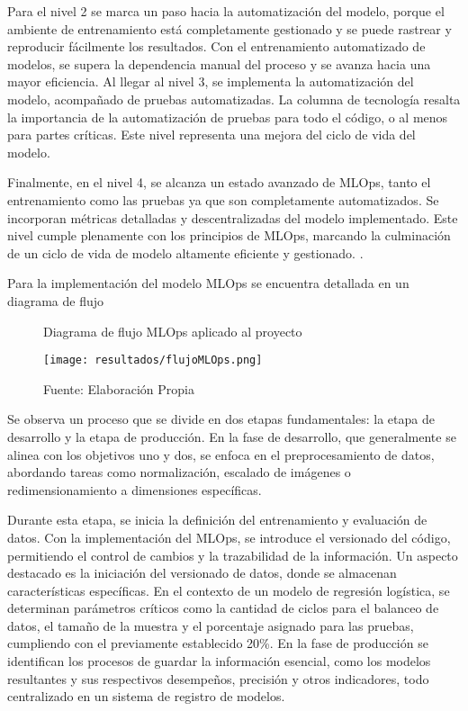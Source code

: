 Para el nivel 2 se marca un paso hacia la automatización del modelo, porque el ambiente de entrenamiento está completamente gestionado y se puede rastrear y reproducir fácilmente los resultados. Con el entrenamiento automatizado de modelos, se supera la dependencia manual del proceso y se avanza hacia una mayor eficiencia. Al llegar al nivel 3, se implementa la automatización del modelo, acompañado de pruebas automatizadas. La columna de tecnología resalta la importancia de la automatización de pruebas para todo el código, o al menos para partes críticas. Este nivel representa una mejora del ciclo de vida del modelo. \newline

Finalmente, en el nivel 4, se alcanza un estado avanzado de MLOps, tanto el entrenamiento como las pruebas ya que son completamente automatizados. Se incorporan métricas detalladas y descentralizadas del modelo implementado. Este nivel cumple plenamente con los principios de MLOps, marcando la culminación de un ciclo de vida de modelo altamente eficiente y gestionado. \citep{rivero2022, visengeriyeva2020}.

Para la implementación del modelo MLOps se encuentra detallada en un diagrama de flujo

\newpage

\begin{figure}[h]
\centering
\caption{Diagrama de flujo MLOps aplicado al proyecto}
\texttt{[image: resultados/flujoMLOps.png]}
\caption*{\footnotesize Fuente: Elaboración Propia}
\label{fig:figuraFlujoMLOps}
\end{figure}

Se observa un proceso que se divide en dos etapas fundamentales: la etapa de desarrollo y la etapa de producción. En la fase de desarrollo, que generalmente se alinea con los objetivos uno y dos, se enfoca en el preprocesamiento de datos, abordando tareas como normalización, escalado de imágenes o redimensionamiento a dimensiones específicas. \newline

Durante esta etapa, se inicia la definición del entrenamiento y evaluación de datos. Con la implementación del MLOps, se introduce el versionado del código, permitiendo el control de cambios y la trazabilidad de la información. Un aspecto destacado es la iniciación del versionado de datos, donde se almacenan características específicas. En el contexto de un modelo de regresión logística, se determinan parámetros críticos como la cantidad de ciclos para el balanceo de datos, el tamaño de la muestra y el porcentaje asignado para las pruebas, cumpliendo con el previamente establecido 20\%. En la fase de producción se identifican los procesos de guardar la información esencial, como los modelos resultantes y sus respectivos desempeños, precisión y otros indicadores, todo centralizado en un sistema de registro de modelos.

